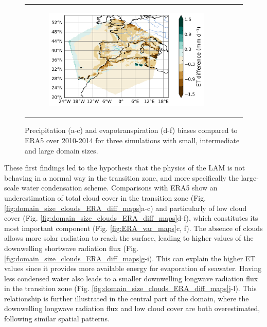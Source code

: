 \begin{figure}[htbp]
\begin{tabular}{ccc}
\begin{subfigure}[b]{0.33\textwidth}
            \includegraphics[width=\textwidth]{images/chap4/domain_size/diff_map_evap_era_LAM_2000km_NBP80.png}
        \end{subfigure} 
    \end{tabular}
    \caption{Precipitation (a-c) and evapotranspiration (d-f) biases compared to ERA5 over 2010-2014 for three simulations with small, intermediate and large domain sizes.}
    \label{fig:domain_size_P_ET_ERA_diff_maps}
\end{figure}

These first findings led to the hypothesis that the physics of the LAM is not behaving in a normal way in the transition zone, and more specifically the large-scale water condensation scheme. 
Comparisons with ERA5 show an underestimation of total cloud cover in the transition zone (Fig. \ref{fig:domain_size_clouds_ERA_diff_maps}a-c) and particularly of low cloud cover (Fig. \ref{fig:domain_size_clouds_ERA_diff_maps}d-f), which constitutes its most important component (Fig. \ref{fig:ERA_var_maps}c, f). %
The absence of clouds allows more solar radiation to reach the surface, leading to higher values of the downwelling shortwave radiation flux (Fig. \ref{fig:domain_size_clouds_ERA_diff_maps}g-i). This can explain the higher ET values since it provides more available energy for evaporation of seawater.
Having less condensed water also leads to a smaller downwelling longwave radiation flux in the transition zone (Fig. \ref{fig:domain_size_clouds_ERA_diff_maps}j-l). This relationship is further illustrated in the central part of the domain, where the downwelling longwave radiation flux and low cloud cover are both overestimated, following similar spatial patterns.

